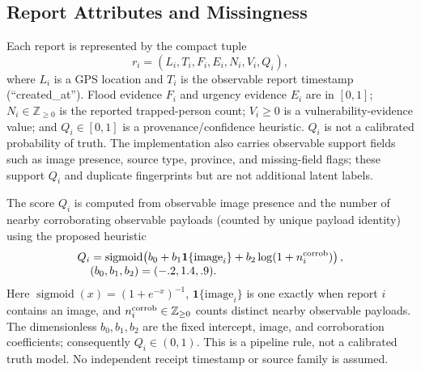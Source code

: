 \documentclass[runningheads]{llncs}
\begin{document}
\subsection{Report Attributes and Missingness}

Each report is represented by the compact tuple
\[
r_i=(L_i,T_i,F_i,E_i,N_i,V_i,Q_i),
\]
where $L_i$ is a GPS location and $T_i$ is the observable report timestamp
(``created\_at''). Flood evidence $F_i$ and urgency evidence $E_i$ are in
$[0,1]$; $N_i\in\mathbb{Z}_{\geq0}$ is the reported trapped-person count;
$V_i\geq0$ is a vulnerability-evidence value; and $Q_i\in[0,1]$ is a
provenance/confidence heuristic. $Q_i$ is not a calibrated probability of
truth. The implementation also carries observable support fields such as
image presence, source type, province, and missing-field flags; these support
$Q_i$ and duplicate fingerprints but are not additional latent labels.

The score $Q_i$ is computed from observable image presence and the number of
nearby corroborating observable payloads (counted by unique payload identity)
using the proposed heuristic
\begin{equation}
\begin{aligned}
Q_i&=\operatorname{sigmoid}\!\left(b_0+b_1\mathbf{1}\{\text{image}_i\}
 +b_2\log(1+n_i^{\rm corrob})\right),\\[-1mm]
&(b_0,b_1,b_2)=(-.2,1.4,.9).
\end{aligned}
\label{eq:confidence}
\end{equation}
Here $\operatorname{sigmoid}(x)=(1+e^{-x})^{-1}$,
$\mathbf{1}\{\text{image}_i\}$ is one exactly when report $i$ contains an
image, and $n_i^{\rm corrob}\in\mathbb Z_{\geq0}$ counts distinct nearby
observable payloads. The dimensionless $b_0,b_1,b_2$ are the fixed intercept,
image, and corroboration coefficients; consequently $Q_i\in(0,1)$. This is a
pipeline rule, not a calibrated truth model. No independent receipt timestamp
or source family is assumed.
\end{document}
